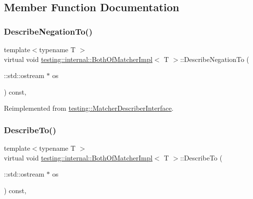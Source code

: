 \subsection{Member Function Documentation}
\mbox{\label{classtesting_1_1internal_1_1_both_of_matcher_impl_a4f6017c7aca6e5c8166ff4c613d8dbec}} 
\subsubsection{\texorpdfstring{Describe\+Negation\+To()}{DescribeNegationTo()}}
{\footnotesize\ttfamily template$<$typename T $>$ \\
virtual void \hyperlink{classtesting_1_1internal_1_1_both_of_matcher_impl}{testing\+::internal\+::\+Both\+Of\+Matcher\+Impl}$<$ T $>$\+::Describe\+Negation\+To (\begin{DoxyParamCaption}\item[{\+::std\+::ostream $\ast$}]{os }\end{DoxyParamCaption}) const\hspace{0.3cm}{\ttfamily [inline]}, {\ttfamily [virtual]}}



Reimplemented from \hyperlink{classtesting_1_1_matcher_describer_interface_a2071afbc47097c4d1c0064275af34db0}{testing\+::\+Matcher\+Describer\+Interface}.

\mbox{\label{classtesting_1_1internal_1_1_both_of_matcher_impl_a3a1f92f7b093d36ab38c35fbcae4ce4d}} 
\subsubsection{\texorpdfstring{Describe\+To()}{DescribeTo()}}
{\footnotesize\ttfamily template$<$typename T $>$ \\
virtual void \hyperlink{classtesting_1_1internal_1_1_both_of_matcher_impl}{testing\+::internal\+::\+Both\+Of\+Matcher\+Impl}$<$ T $>$\+::Describe\+To (\begin{DoxyParamCaption}\item[{\+::std\+::ostream $\ast$}]{os }\end{DoxyParamCaption}) const\hspace{0.3cm}{\ttfamily [inline]}, {\ttfamily [virtual]}}



